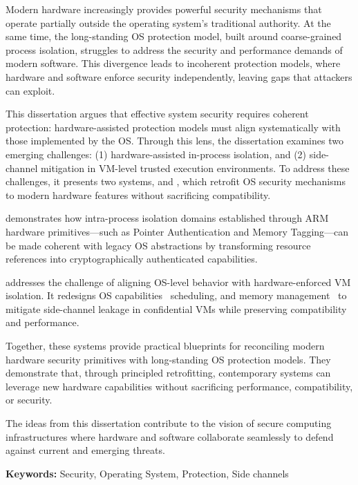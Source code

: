 \documentclass[a4paper,11pt]{SKKU-PhD-Thesis-compact}
\begin{document}
\newpage
%
\makeabstracttitle

Modern hardware increasingly provides powerful security mechanisms that operate partially outside the operating system’s traditional authority.
At the same time, the long-standing OS protection model, built around coarse-grained process isolation, struggles to address the security and performance demands of modern software.
This divergence leads to incoherent protection models, where hardware and software enforce security independently, leaving gaps that attackers can exploit.

This dissertation argues that effective system security requires coherent protection: hardware-assisted protection models must align systematically with those implemented by the OS.
Through this lens, the dissertation examines two emerging challenges: (1) hardware-assisted in-process isolation, and (2) side-channel mitigation in VM-level trusted execution environments.
To address these challenges, it presents two systems, \capacity and \incognitos, which retrofit OS security mechanisms to modern hardware features without sacrificing compatibility.

\capacity demonstrates how intra-process isolation domains established through ARM hardware primitives—such as Pointer Authentication and Memory Tagging—can be made coherent with legacy OS abstractions by transforming resource references into cryptographically authenticated capabilities.

\incognitos addresses the challenge of aligning OS-level behavior with hardware-enforced VM isolation.
It redesigns OS capabilities \dash\ scheduling, and memory management \dash\ to mitigate side-channel leakage in confidential VMs while preserving compatibility and performance.

Together, these systems provide practical blueprints for reconciling modern hardware security primitives with long-standing OS protection models.
They demonstrate that, through principled retrofitting, contemporary systems can leverage new hardware capabilities without sacrificing performance, compatibility, or security.

The ideas from this dissertation contribute to the vision of secure computing infrastructures where hardware and software collaborate seamlessly to defend against current and emerging threats.




\textbf{Keywords:} Security, Operating System, Protection, Side channels
\end{document}
